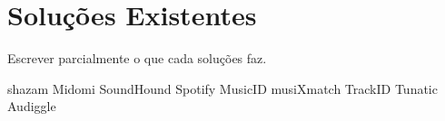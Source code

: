 \chapter{Soluções Existentes}
Escrever parcialmente o que cada soluções faz.

shazam
Midomi
SoundHound
Spotify
MusicID
musiXmatch
TrackID
Tunatic
Audiggle